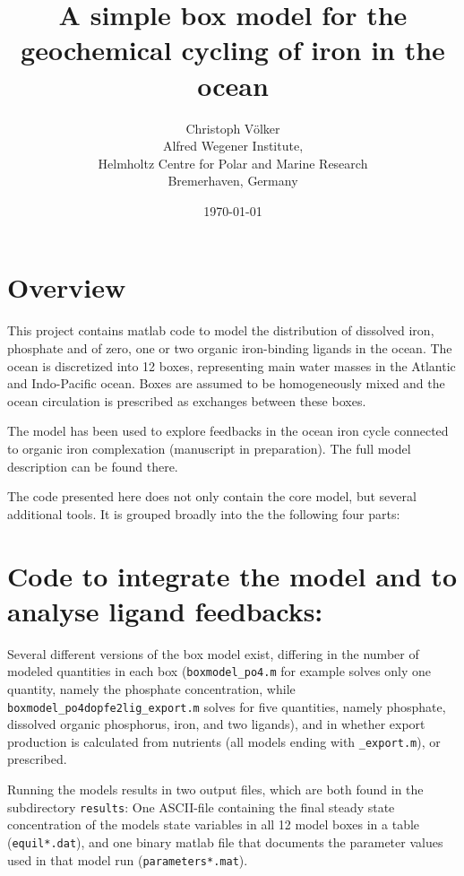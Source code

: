 \documentclass[a4paper]{scrartcl}
\begin{document}
\title{A simple box model for the geochemical cycling of iron in the ocean}

\author{Christoph V\"olker \\
  Alfred Wegener Institute, \\
  Helmholtz Centre for Polar and Marine Research \\
  Bremerhaven, Germany}
\date{\today}

\maketitle

\section{Overview}

This project contains matlab code to model the distribution of dissolved iron, 
phosphate and of zero, one or two organic iron-binding ligands in the ocean. 
The ocean is discretized into 12 boxes, representing main water masses in the
Atlantic and Indo-Pacific ocean. Boxes are assumed to be homogeneously mixed
and the ocean circulation is prescribed as exchanges between these boxes.

The model has been used to explore feedbacks in the ocean iron cycle
connected to organic iron complexation (manuscript in
preparation). The full model description can be found there.

The code presented here does not only contain the core model, but
several additional tools. It is grouped broadly into the the following
four parts:

\section{Code to integrate the model and to analyse ligand
  feedbacks:}

Several different versions of the box model exist, differing in the
number of modeled quantities in each box (\verb+boxmodel_po4.m+ for
example solves only one quantity, namely the phosphate concentration,
while \verb+boxmodel_po4dopfe2lig_export.m+ solves for five
quantities, namely phosphate, dissolved organic phosphorus, iron, and
two ligands), and in whether export production is calculated from
nutrients (all models ending with \verb+_export.m+), or
prescribed.

Running the models results in two output files, which are
both found in the subdirectory \verb+results+: One ASCII-file
containing the final steady state concentration of the models state
variables in all 12 model boxes in a table (\verb+equil*.dat+), and
one binary matlab file that documents the parameter values used in
that model run (\verb+parameters*.mat+).
\end{document}
